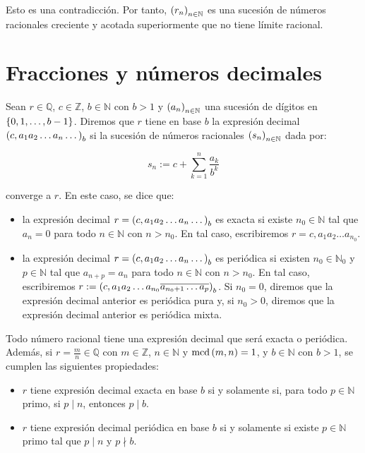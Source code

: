 Esto es una contradicción. Por tanto, $\left(r_n\right)_{n\in\mathbb{N}}$ es una sucesión de números racionales creciente y acotada superiormente que no tiene límite racional.

\section{Fracciones y números decimales}

\begin{definition}
  \rm Sean $r\in\mathbb{Q}$, $c\in\mathbb{Z}$, $b\in\mathbb{N}$ con $b>1$ y $\left(a_n\right)_{n\in\mathbb{N}}$ una sucesión de dígitos en $\left\{0,1,\dots,b-1\right\}$. Diremos que $r$ tiene en base $b$ la expresión decimal $\left(c,a_1a_2\dots a_n\dots\right)_b$ si la sucesión de números racionales $\left(s_n\right)_{n\in\mathbb{N}}$ dada por:

  \begin{equation}
    s_n:=c+\sum_{k=1}^{n}{\frac{a_k}{b^k}}
  \end{equation}

  converge a $r$. En este caso, se dice que:

  \begin{itemize}
    \item la expresión decimal $r=\left(c,a_1a_2\dots a_n\dots\right)_b$ es exacta si existe $n_0\in\mathbb{N}$ tal que $a_n=0$ para todo $n\in\mathbb{N}$ con $n>n_0$. En tal caso, escribiremos $r=c,a_1a_2\dots a_{n_0}$.
    \item la expresión decimal $r=\left(c,a_1a_2\dots a_n\dots\right)_b$ es periódica si existen $n_0\in\mathbb{N}_0$ y $p\in\mathbb{N}$ tal que $a_{n+p}=a_n$ para todo $n\in\mathbb{N}$ con $n>n_0$. En tal caso, escribiremos $r:=\left(c,a_1a_2\dots a_{n_0}\overline{a_{n_0+1}\dots a_p}\right)_b$. Si $n_0=0$, diremos que la expresión decimal anterior es periódica pura y, si $n_0>0$, diremos que la expresión decimal anterior es periódica mixta.
  \end{itemize}
\end{definition}

\begin{theorem}
  \rm Todo número racional tiene una expresión decimal que será exacta o periódica. Además, si $\displaystyle r=\frac{m}{n}\in\mathbb{Q}$ con $m\in\mathbb{Z}$, $n\in\mathbb{N}$ y $\text{mcd}\left(m,n\right)=1$, y $b\in\mathbb{N}$ con $b>1$, se cumplen las siguientes propiedades:

  \begin{itemize}
    \item $r$ tiene expresión decimal exacta en base $b$ si y solamente si, para todo $p\in\mathbb{N}$ primo, si $p\mid n$, entonces $p\mid b$. 
    \item $r$ tiene expresión decimal periódica en base $b$ si y solamente si existe $p\in\mathbb{N}$ primo tal que $p\mid n$ y $p\nmid b$.
  \end{itemize}
\end{theorem}

